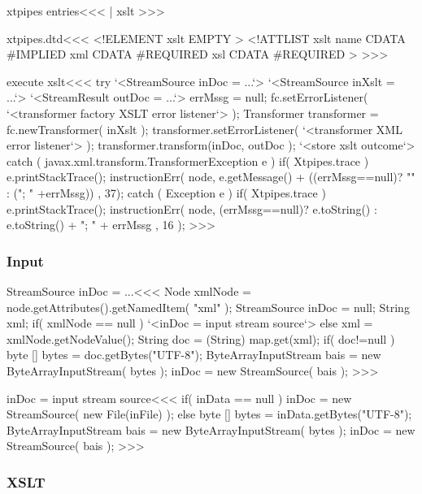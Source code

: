 \documentclass{article}
\begin{document}
{\<xtpipes entries\><<<
| xslt
>>>


\<xtpipes.dtd\><<<
<!ELEMENT xslt EMPTY >  
<!ATTLIST xslt
          name CDATA #IMPLIED
          xml  CDATA #REQUIRED 
          xsl  CDATA #REQUIRED 
>
>>>

\<execute xslt\><<<
try{ 
   `<StreamSource inDoc = ...`>
   `<StreamSource inXslt = ...`>
   `<StreamResult outDoc = ...`>
   errMssg = null;
   fc.setErrorListener( `<transformer factory XSLT error listener`> );
   Transformer transformer = fc.newTransformer( inXslt );
   transformer.setErrorListener( `<transformer XML error listener`> ); 
   transformer.transform(inDoc, outDoc ); 
   `<store xslt outcome`>
} catch ( javax.xml.transform.TransformerException e ){
   if( Xtpipes.trace ){ e.printStackTrace(); }
   instructionErr( node, 
                   e.getMessage()
                   + 
                   ((errMssg==null)? "" : ("; " +errMssg))
                   , 37);
} catch ( Exception e ){  
   if( Xtpipes.trace ){ e.printStackTrace(); }
   instructionErr( node, (errMssg==null)? e.toString() 
                                        : e.toString() + "; " + errMssg
                       , 16 );   
} 
>>>







\subsubsection{Input}

\<StreamSource inDoc = ...\><<<
Node xmlNode = node.getAttributes().getNamedItem( "xml" );
StreamSource inDoc = null;
String xml;
if( xmlNode == null ){
   `<inDoc = input stream source`>
} else {
   xml = xmlNode.getNodeValue();
   String doc = (String) map.get(xml);
   if( doc!=null ){
      byte [] bytes = doc.getBytes("UTF-8");
      ByteArrayInputStream bais = new ByteArrayInputStream( bytes );
      inDoc = new StreamSource( bais );
}  }
>>>




\<inDoc = input stream source\><<<
if( inData == null ){
   inDoc = new StreamSource( new File(inFile) );
} else {
   byte [] bytes = inData.getBytes("UTF-8");
   ByteArrayInputStream bais = new ByteArrayInputStream( bytes );
   inDoc = new StreamSource( bais );
}
>>>



\subsubsection{XSLT}

}
\end{document}
